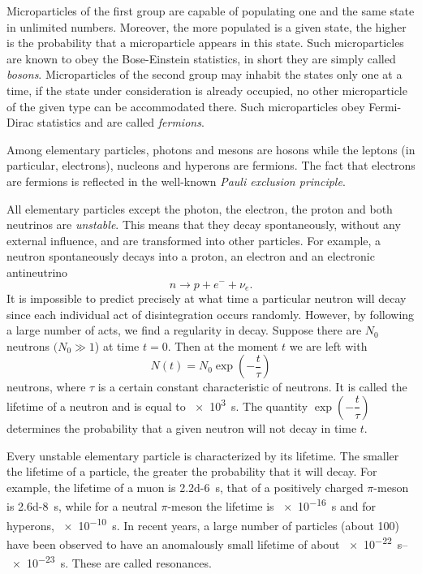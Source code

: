 \documentclass[a4paper,sfsidenotes,colorlinks=true]{tufte-book}
\numberwithin{equation}{section}
\numberwithin{figure}{section}
\begin{document}
Microparticles of the first group are capable of populating one and
the same state in unlimited numbers. Moreover, the more
populated is a given state, the higher is the probability that a
microparticle appears in this state. Such microparticles are known to
obey the Bose-Einstein statistics, in short they are simply called
\emph{bosons}. Microparticles of the second group may inhabit the states
only one at a time, if the state under consideration is already
occupied, no other microparticle of the given type can be accommodated
there. Such microparticles obey Fermi-Dirac statistics and are called
\emph{fermions}.

Among elementary particles, photons and mesons are hosons while the
leptons (in particular, electrons), nucleons and hyperons are
fermions. The fact that electrons are fermions is reflected in the
well-known \emph{Pauli exclusion principle}.


All elementary particles
except the photon, the electron, the proton and both neutrinos are
\emph{unstable}. This means that they decay spontaneously, without any
external influence, and are transformed into other particles. For
example, a neutron spontaneously decays into a proton, an electron and
an electronic antineutrino 
\begin{equation*}
n \to p + e^{-} + \nu_{e}.
\end{equation*}
It is impossible to predict precisely at what time a particular
neutron will decay since each individual act of disintegration occurs
randomly. However, by following a large number of acts, we find a
regularity in decay. Suppose there are $N_{0}$ neutrons $(N_{0} \gg
1$) at time $t =0$. Then at the moment $t$ we are left with
\begin{equation*}
N (t) = N_{0} \exp \left(-\dfrac{t}{\tau} \right)
\end{equation*}
neutrons, where $\tau$ is a certain constant characteristic of
neutrons. It is called the lifetime of a neutron and is equal to
\SI{e3}{\second}. The quantity $\exp \left(-\dfrac{t}{\tau} \right)$
determines the probability that a given neutron will not decay in time $t$.  

Every unstable elementary particle is characterized by its
lifetime. The smaller the lifetime of a particle, the greater the
probability that it will decay. For example, the lifetime of a muon is
\SI{2.2d-6}{\second}, that of a positively charged $\pi$-meson is
\SI{2.6d-8}{\second}, while for a neutral $\pi$-meson the lifetime is
\SI{e-16}{\second} and for hyperons, \SI{e-10}{\second}. In recent
years, a large number of particles (about 100) have been observed to
have an anomalously small lifetime of about \SIrange{e-22}{e-23}{\second}. These
are called resonances. 
\end{document}
